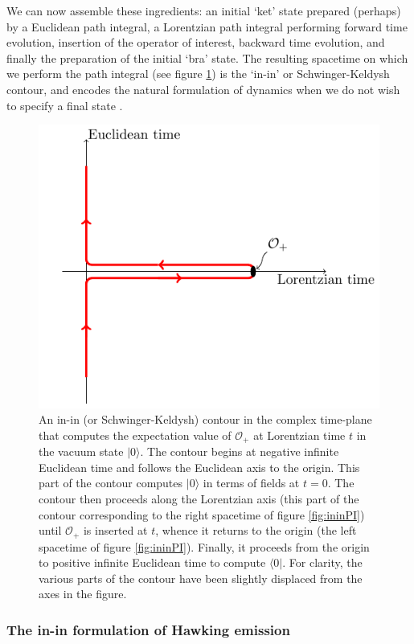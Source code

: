 \documentclass[letterpaper,12pt]{article}
\begin{document}
We can now assemble these ingredients: an initial `ket' state prepared (perhaps) by a Euclidean path integral, a Lorentzian path integral performing forward time evolution, insertion of the operator of interest, backward time evolution, and finally the preparation of the initial `bra' state. The resulting spacetime on which we perform the path integral (see figure \ref{fig:SK}) is the `in-in' or Schwinger-Keldysh contour, and encodes the natural formulation of dynamics when we do not wish to specify a final state \cite{Schwinger:1960qe,Bakshi:1962dv,Keldysh:1964ud}.

\begin{figure}[h!]
\centering
	\includegraphics[width=.5\textwidth]{SK.pdf}
	\caption{An in-in (or Schwinger-Keldysh) contour in the complex time-plane that computes the expectation value of $\mathcal{O}_+$ at Lorentzian time $t$ in the vacuum state $|0\rangle$. The contour begins at negative infinite Euclidean time and follows the Euclidean axis to the origin.  This part of the contour computes $|0\rangle$ in terms of fields at $t=0$.  The contour then proceeds along the Lorentzian axis (this part of the contour corresponding to the right spacetime of figure \ref{fig:ininPI}) until $\mathcal{O}_+$ is inserted at $t$, whence it returns to the origin (the left spacetime of figure \ref{fig:ininPI}).  Finally, it proceeds from the origin to positive infinite Euclidean time to compute $\langle 0|$.  For clarity, the various parts of the contour have been slightly displaced from the axes in the figure. \label{fig:SK}}
\end{figure}



\subsubsection{The in-in formulation of Hawking emission}
\label{sec:PIHawk}
\end{document}
